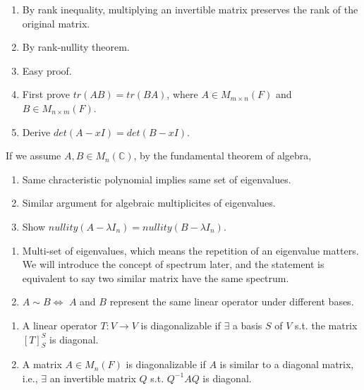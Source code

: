 \documentclass[12pt]{article}
\begin{document}
\begin{tcolorbox}[boxrule=0.5pt]
\begin{pf}
\begin{enumerate}
    \item By rank inequality, multiplying an invertible matrix preserves the rank of the original matrix.
    \item By rank-nullity theorem.
    \item Easy proof.
    \item First prove $tr(AB)=tr(BA)$, where $A\in M_{m\times n}(F)$ and $B\in M_{n\times m}(F)$.
    \item Derive $det(A-xI)=det(B-xI)$.
\end{enumerate}

If we assume $A,B\in M_n(\mathbb{C})$, by the fundamental theorem of algebra,
\begin{enumerate}
    \item Same chracteristic polynomial implies same set of eigenvalues.
    \item Similar argument for algebraic multiplicites of eigenvalues.
    \item Show $nullity(A-\lambda I_n)=nullity(B-\lambda I_n)$.
\end{enumerate}

\end{pf}
\end{tcolorbox}


\begin{remark}
    \begin{enumerate}
        \item Multi-set of eigenvalues, which means the repetition of an eigenvalue matters. We will introduce the concept of spectrum later, and the statement is equivalent to say two similar matrix have the same spectrum.
        \item $A\sim B \Leftrightarrow$ $A$ and $B$ represent the same linear operator under different bases.
    \end{enumerate}
\end{remark}


\begin{definition}
    \begin{enumerate}
        \item A linear operator $T:V\rightarrow V$ is diagonalizable if $\exists$ a basis $S$ of $V$ s.t. the matrix $[T]^{S}_{S}$ is diagonal.
        \item A matrix $A\in M_n(F)$ is diagonalizable if $A$ is similar to a diagonal matrix, i.e., $\exists$ an invertible matrix $Q$ s.t. $Q^{-1}AQ$ is diagonal.
    \end{enumerate}
\end{definition}
\end{document}

